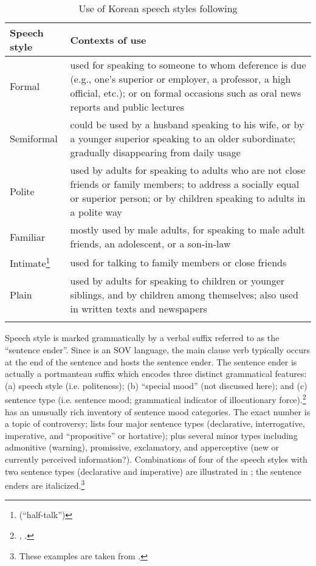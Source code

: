 \begin{table}[H]
\caption{Use of Korean speech styles following \citep[120]{Pak2008}}

\label{extab:11.22}
\begin{tabularx}{\textwidth}{lQ}
\lsptoprule
 Speech style & Contexts of use\\
 \midrule
 Formal & used for speaking to someone to whom deference is due (e.g., one’s superior or employer, a professor, a high official, etc.); or on formal occasions such as oral news reports and public lectures\\
 \tablevspace
 Semiformal & could be used by a husband speaking to his wife, or by a younger superior speaking to an older subordinate; gradually disappearing from daily usage\\
  \tablevspace
 Polite & used by adults for speaking to adults who are not close friends or family members; to address a socially equal or superior person; or by children speaking to adults in a polite way\\
  \tablevspace
 Familiar & mostly used by male adults, for speaking to male adult friends, an adolescent, or a son-in-law\\
 \tablevspace
 Intimate\footnote{(“half-talk”)} & used for talking to family members or close friends\\
 \tablevspace
 Plain & used by adults for speaking to children or younger siblings, and by children among themselves; also used in written texts and newspapers\\
\lspbottomrule
\end{tabularx}
\end{table}

Speech style is marked grammatically by a verbal suffix referred to as the “sentence ender”. Since  is an SOV language, the main clause verb typically occurs at the end of the sentence and hosts the sentence ender. The sentence ender is actually a portmanteau suffix which encodes three distinct grammatical features: (a) speech style (i.e. politeness); (b) “special mood” (not discussed here); and (c) sentence type (i.e. sentence mood; grammatical indicator of illocutionary force).\footnote{\citet{Sohn1999}, \citet{Pak2008}.}  has an unusually rich inventory of sentence mood categories. The exact number is a topic of controversy; \citet{Sohn1999} lists four major sentence types (declarative, interrogative, imperative, and “propositive” or hortative); plus several minor types including admonitive (warning), promissive, exclamatory, and apperceptive (new or currently perceived information?). Combinations of four of the speech styles with two sentence types (declarative and imperative) are illustrated in ; the sentence enders are italicized.\footnote{These examples are taken from \citet{PakEtAl2013}.}
 
